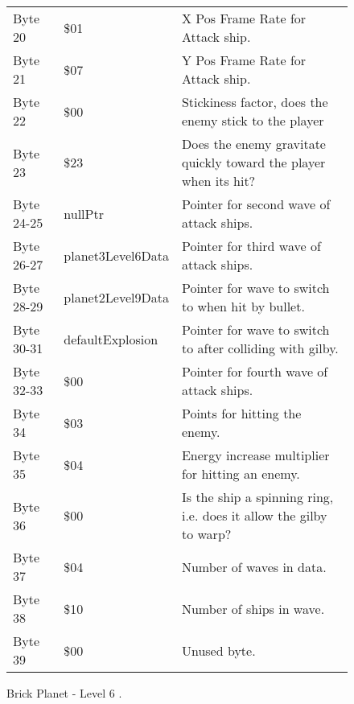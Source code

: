 \begin{figure}[H]
{\begin{adjustbox}{width=12cm}
\begin{tabular}{lll}
 Byte 20    & \$01                     & X Pos Frame Rate for Attack ship.                                   \\
 Byte 21    & \$07                     & Y Pos Frame Rate for Attack ship.                                   \\
 Byte 22    & \$00                     & Stickiness factor, does the enemy stick to the player               \\
 Byte 23    & \$23                     & Does the enemy gravitate quickly toward the player when its hit?    \\
 Byte 24-25 & nullPtr                 & Pointer for second wave of attack ships.                            \\
 Byte 26-27 & planet3Level6Data       & Pointer for third wave of attack ships.                             \\
 Byte 28-29 & planet2Level9Data       & Pointer for wave to switch to when hit by bullet.                   \\
 Byte 30-31 & defaultExplosion        & Pointer for  wave to switch to after colliding with gilby.          \\
 Byte 32-33 & \$00                     & Pointer for fourth wave of attack ships.                            \\
 Byte 34    & \$03                     & Points for hitting the enemy.                                       \\
 Byte 35    & \$04                     & Energy increase multiplier for hitting an enemy.                    \\
 Byte 36    & \$00                     & Is the ship a spinning ring, i.e. does it allow the gilby to warp?  \\
 Byte 37    & \$04                     & Number of waves in data.                                            \\
 Byte 38    & \$10                     & Number of ships in wave.                                            \\
 Byte 39    & \$00                     & Unused byte.                                                        \\
\bottomrule
\end{tabular}

  \end{adjustbox}

  }\caption*{Brick Planet - Level 6
.}
\end{figure}

